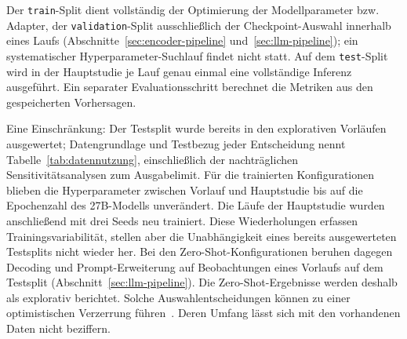 Der \texttt{train}-Split dient vollständig der Optimierung der
Modellparameter bzw. Adapter, der \texttt{validation}-Split
ausschließlich der Checkpoint-Auswahl innerhalb eines Laufs
(Abschnitte~\ref{sec:encoder-pipeline} und~\ref{sec:llm-pipeline}); ein
systematischer Hyperparameter-Suchlauf findet nicht statt.
Auf dem \texttt{test}-Split wird in der Hauptstudie je Lauf genau einmal
eine vollständige Inferenz ausgeführt. Ein separater Evaluationsschritt berechnet die
Metriken aus den gespeicherten Vorhersagen.

Eine Einschränkung: Der Testsplit wurde bereits in den explorativen
Vorläufen ausgewertet; Datengrundlage und Testbezug jeder Entscheidung nennt
Tabelle~\ref{tab:datennutzung}, einschließlich der nachträglichen
Sensitivitätsanalysen zum Ausgabelimit.
Für die trainierten Konfigurationen blieben die Hyperparameter zwischen
Vorlauf und Hauptstudie bis auf die Epochenzahl des 27B-Modells
unverändert. Die Läufe der Hauptstudie
wurden anschließend mit drei Seeds neu trainiert. Diese Wiederholungen
erfassen Trainingsvariabilität, stellen aber die Unabhängigkeit eines
bereits ausgewerteten Testsplits nicht wieder her.
Bei den Zero-Shot-Konfigurationen beruhen dagegen Decoding und
Prompt-Erweiterung auf Beobachtungen eines Vorlaufs auf dem Testsplit
(Abschnitt~\ref{sec:llm-pipeline}).
Die Zero-Shot-Ergebnisse werden deshalb als explorativ berichtet. Solche
Auswahlentscheidungen können zu einer optimistischen Verzerrung führen~\cite{cawley2010selectionbias}. Deren Umfang lässt sich mit den vorhandenen Daten
nicht beziffern.

